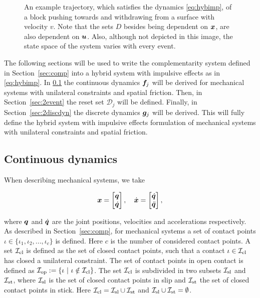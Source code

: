 \documentclass[../DC2017114Bouma.tex]{subfiles}
\begin{document}
\begin{figure}[h]
\begin{subfigure}[b]{\textwidth}
\label{fig:2exampletraj}
\end{subfigure}
\caption{An example trajectory, which satisfies the dynamics \eqref{eq:hybimp}, of a block pushing towards and withdrawing from a surface with velocity $v$.  Note that the sets $D$ besides being dependent on ${\boldsymbol{x}}$, are also dependent on ${\boldsymbol{u}}$. Also, although not depicted in this image, the state space of the system varies with every event.}
\label{fig:2example}
\end{figure}

The following sections will be used to write the complementarity system defined in Section~\ref{sec:comp} into a hybrid system with impulsive effects as in \eqref{eq:hybimp}. In \ref{sec:2contdyn} the continuous dynamics ${\boldsymbol{f}}_j$ will be derived for mechanical systems with unilateral constraints and spatial friction. Then, in Section~\ref{sec:2event} the reset set $\mathcal{D}_j$ will be defined. Finally, in Section~\ref{sec:2discdyn} the discrete dynamics ${\boldsymbol{g}}_j$ will be derived. This will fully define the hybrid system with impulsive effects formulation of mechanical systems with unilateral constraints and spatial friction.

\subsection{Continuous dynamics}\label{sec:2contdyn}
When describing mechanical systems, we take 

\begin{align}
{\boldsymbol{x}} = \begin{bmatrix}
{\boldsymbol{q}}\\ \dot{{\boldsymbol{q}}}
\end{bmatrix},\quad
\dot{{\boldsymbol{x}}} = \begin{bmatrix}
\dot{{\boldsymbol{q}}}\\ \ddot{{\boldsymbol{q}}}
\end{bmatrix},
\end{align}

where ${\boldsymbol{q}}$ and $\dot{{\boldsymbol{q}}}$ are the joint positions, velocities and accelerations respectively. As described in Section~\ref{sec:comp}, for mechanical systems a set of contact points $\iota\in\{\iota_1,\iota_2,...,\iota_c\}$ is defined. Here $c$ is the number of considered contact points. A set $\mathcal{I}_{\text{cl}}$ is defined as the set of closed contact points, such that a contact $\iota\in\mathcal{I}_{\text{cl}}$ has closed a unilateral constraint. The set of contact points in open contact is defined as $\Ic_{\text{op}} := \{\iota\ |\ \iota\notin\Ic_{\text{cl}}\}$. The set $\mathcal{I}_{\text{cl}}$ is subdivided in two subsets $\mathcal{I}_{\text{sl}}$ and $\mathcal{I}_{\text{st}}$, where $\mathcal{I}_{\text{sl}}$ is the set of closed contact points in slip and $\mathcal{I}_{\text{st}}$ the set of closed contact points in stick. Here $\mathcal{I}_{\text{cl}} =\mathcal{I}_{\text{sl}}\cup\mathcal{I}_{\text{st}}$ and $\mathcal{I}_{\text{sl}}\cup\mathcal{I}_{\text{st}}=\emptyset$. 
\end{document}
